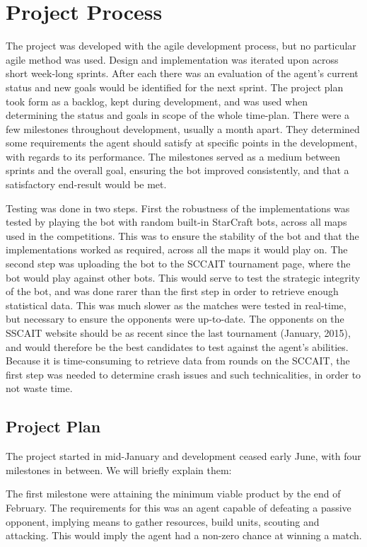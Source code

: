 \chapter{Project Process}
\label{ch:process}
The project was developed with the agile development process, but no particular agile method was used. Design and implementation was iterated upon across short week-long sprints. After each there was an evaluation of the agent's current status and new goals would be identified for the next sprint. The project plan took form as a backlog, kept during development, and was used when determining the status and goals in scope of the whole time-plan. There were a few milestones throughout development, usually a month apart. They determined some requirements the agent should satisfy at specific points in the development, with regards to its performance. The milestones served as a medium between sprints and the overall goal, ensuring the bot improved consistently, and that a satisfactory end-result would be met.

Testing was done in two steps. First the robustness of the implementations was tested by playing the bot with random built-in StarCraft bots, across all maps used in the competitions. This was to ensure the stability of the bot and that the implementations worked as required, across all the maps it would play on. The second step was uploading the bot to the SCCAIT tournament page, where the bot would play against other bots. This would serve to test the strategic integrity of the bot, and was done rarer than the first step in order to retrieve enough statistical data. This was much slower as the matches were tested in real-time, but necessary to ensure the opponents were up-to-date. The opponents on the SSCAIT website should be as recent since the last tournament (January, 2015), and would therefore be the best candidates to test against the agent's abilities. Because it is time-consuming to retrieve data from rounds on the SCCAIT, the first step was needed to determine crash issues and such technicalities, in order to not waste time.

\section{Project Plan}
The project started in mid-January and development ceased early June, with four milestones in between. We will briefly explain them:


The first milestone were attaining the minimum viable product by the end of February. The requirements for this was an agent capable of defeating a passive opponent, implying means to gather resources, build units, scouting and attacking. This would imply the agent had a non-zero chance at winning a match.

